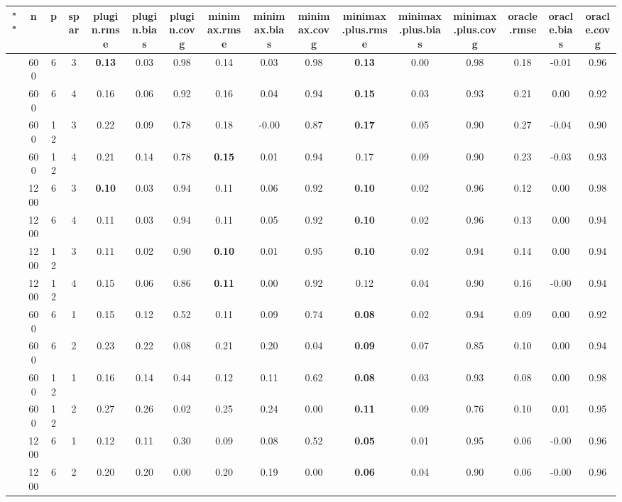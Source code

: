 \begin{table}[ht]
\centering
\begin{tabular}{||c|ccc||ccc|ccc|ccc|ccc}
  \hline
\hline
"" & n & p & spar & plugin.rmse & plugin.bias & plugin.covg & minimax.rmse & minimax.bias & minimax.covg & minimax.plus.rmse & minimax.plus.bias & minimax.plus.covg & oracle.rmse & oracle.bias & oracle.covg \\ 
  \hline
 & 600 & 6 & 3 & \bf 0.13 & 0.03 & 0.98 & 0.14 & 0.03 & 0.98 & \bf 0.13 & 0.00 & 0.98 & 0.18 & -0.01 & 0.96 \\ 
   & 600 & 6 & 4 & 0.16 & 0.06 & 0.92 & 0.16 & 0.04 & 0.94 & \bf 0.15 & 0.03 & 0.93 & 0.21 & 0.00 & 0.92 \\ 
   & 600 & 12 & 3 & 0.22 & 0.09 & 0.78 & 0.18 & -0.00 & 0.87 & \bf 0.17 & 0.05 & 0.90 & 0.27 & -0.04 & 0.90 \\ 
   & 600 & 12 & 4 & 0.21 & 0.14 & 0.78 & \bf 0.15 & 0.01 & 0.94 & 0.17 & 0.09 & 0.90 & 0.23 & -0.03 & 0.93 \\ 
   & 1200 & 6 & 3 & \bf 0.10 & 0.03 & 0.94 & 0.11 & 0.06 & 0.92 & \bf 0.10 & 0.02 & 0.96 & 0.12 & 0.00 & 0.98 \\ 
   & 1200 & 6 & 4 & 0.11 & 0.03 & 0.94 & 0.11 & 0.05 & 0.92 & \bf 0.10 & 0.02 & 0.96 & 0.13 & 0.00 & 0.94 \\ 
   & 1200 & 12 & 3 & 0.11 & 0.02 & 0.90 & \bf 0.10 & 0.01 & 0.95 & \bf 0.10 & 0.02 & 0.94 & 0.14 & 0.00 & 0.94 \\ 
   & 1200 & 12 & 4 & 0.15 & 0.06 & 0.86 & \bf 0.11 & 0.00 & 0.92 & 0.12 & 0.04 & 0.90 & 0.16 & -0.00 & 0.94 \\ 
   \hline
 & 600 & 6 & 1 & 0.15 & 0.12 & 0.52 & 0.11 & 0.09 & 0.74 & \bf 0.08 & 0.02 & 0.94 & 0.09 & 0.00 & 0.92 \\ 
   & 600 & 6 & 2 & 0.23 & 0.22 & 0.08 & 0.21 & 0.20 & 0.04 & \bf 0.09 & 0.07 & 0.85 & 0.10 & 0.00 & 0.94 \\ 
   & 600 & 12 & 1 & 0.16 & 0.14 & 0.44 & 0.12 & 0.11 & 0.62 & \bf 0.08 & 0.03 & 0.93 & 0.08 & 0.00 & 0.98 \\ 
   & 600 & 12 & 2 & 0.27 & 0.26 & 0.02 & 0.25 & 0.24 & 0.00 & \bf 0.11 & 0.09 & 0.76 & 0.10 & 0.01 & 0.95 \\ 
   & 1200 & 6 & 1 & 0.12 & 0.11 & 0.30 & 0.09 & 0.08 & 0.52 & \bf 0.05 & 0.01 & 0.95 & 0.06 & -0.00 & 0.96 \\ 
   & 1200 & 6 & 2 & 0.20 & 0.20 & 0.00 & 0.20 & 0.19 & 0.00 & \bf 0.06 & 0.04 & 0.90 & 0.06 & -0.00 & 0.96 \\ 

\end{tabular}
\end{table}
